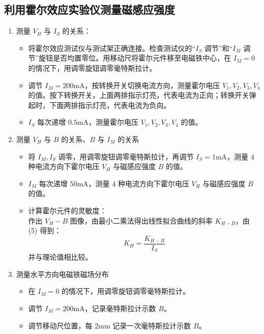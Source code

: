 \documentclass[11pt]{article}
\begin{document}
\subsection{利用霍尔效应实验仪测量磁感应强度}

\begin{enumerate}
    \item 测量 $V_H$ 与 $I_S$ 的关系：
    \begin{itemize}
        \item 将霍尔效应测试仪与测试架正确连接。检查测试仪的“$I_S$ 调节”和“$I_M$ 调节”旋钮是否均置零位。用移动尺将霍尔元件移至电磁铁中心，在 $I_M=0$ 的情况下，用调零旋钮调零毫特斯拉计。
        \item 调节 $I_M=200\text{mA}$，按转换开关切换电流方向，测量霍尔电压 $V_1, V_2, V_3, V_4$ 的值。按下转换开关，上面两排指示灯亮，代表电流为正向；转换开关弹起时，下面两排指示灯亮，代表电流为负向。
        \item $I_S$ 每次递增 $0.5\text{mA}$，测量霍尔电压 $V_1, V_2, V_3, V_4$ 的值。
    \end{itemize}

    \item 测量 $V_H$ 与 $B$ 的关系、$B$ 与 $I_M$ 的关系
    \begin{itemize}
        \item 将 $I_M, I_S$ 调零，用调零旋钮调零毫特斯拉计，再调节 $I_S=1\text{mA}$，测量 4 种电流方向下霍尔电压 $V_H$ 与磁感应强度 $B$ 的值。
        \item $I_M$ 每次递增 $50\text{mA}$，测量 4 种电流方向下霍尔电压 $V_H$ 与磁感应强度 $B$ 的值。
        \item 计算霍尔元件的灵敏度：\\
        作出 $V_H - B$ 图像，由最小二乘法得出线性拟合曲线的斜率 $K_{H-B}$，由 (5) 得到：
        \begin{equation}
            K_H = \frac{K_{H-B}}{I_S} \tag{20}
        \end{equation}
        并与理论值相比较。
    \end{itemize}

    \item 测量水平方向电磁铁磁场分布
    \begin{itemize}
        \item 在 $I_M=0$ 的情况下，用调零旋钮调零毫特斯拉计。
        \item 调节 $I_M=200\text{mA}$，记录毫特斯拉计示数 $B$。
        \item 调节移动尺位置，每 $2\text{mm}$ 记录一次毫特斯拉计示数 $B$。
    \end{itemize}


\end{enumerate}
\end{document}
